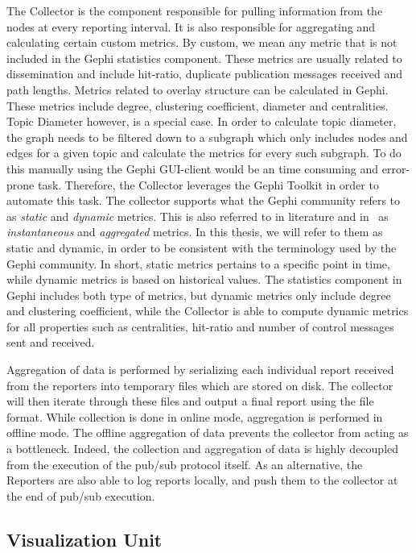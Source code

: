 The Collector is the component responsible for pulling information from
the nodes at every reporting interval. It is also responsible for
aggregating and calculating certain custom metrics. By custom, we mean
any metric that is not included in the Gephi statistics component. These
metrics are usually related to dissemination and include hit-ratio,
duplicate publication messages received and path lengths. Metrics
related to overlay structure can be calculated in Gephi. These metrics
include degree, clustering coefficient, diameter and centralities. Topic
Diameter however, is a special case. In order to calculate topic
diameter, the graph needs to be filtered down to a subgraph which only
includes nodes and edges for a given topic and calculate the metrics for
every such subgraph. To do this manually using
the Gephi GUI-client would be an time consuming and error-prone task.
Therefore, the Collector  leverages the Gephi Toolkit in order to
automate this task. The collector supports what the Gephi community
refers to as \emph{static} and \emph{dynamic} metrics. This is also
referred to in literature and in~\cite{korsveien2014vizpub} as
\emph{instantaneous} and \emph{aggregated} metrics. In this thesis, we
will refer to them as static and dynamic, in order to be consistent
with the terminology used by the Gephi community. In short, static
metrics pertains to a specific point in time, while dynamic metrics is
based on historical values. The statistics component in Gephi includes
both type of metrics, but dynamic metrics only include degree and
clustering coefficient, while the Collector is able to compute dynamic
metrics for all properties such as centralities, hit-ratio and number of
control messages sent and received.

Aggregation of data is performed by serializing each individual report received
from the reporters into temporary files which are stored on disk. The
collector will then iterate through these files and output a final
report using the \gexf file format. While collection is done in online
mode, aggregation is performed in offline mode. The offline aggregation
of data prevents the collector from acting as a bottleneck. Indeed, the
collection and aggregation of data is highly decoupled from the
execution of the pub/sub protocol itself. As an alternative,
the Reporters are also able to log reports locally, and push them to
the collector at the end of pub/sub execution.

\subsection{Visualization Unit}

